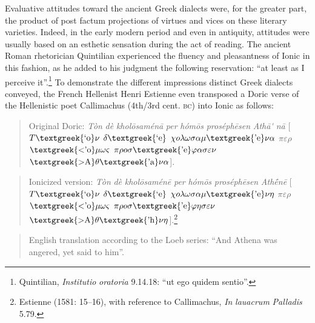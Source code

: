 \documentclass[output=paper]{langsci/langscibook}
\begin{document}
Evaluative attitudes toward the ancient Greek dialects were, for the greater part, the product of post factum projections of virtues and vices on these literary varieties. Indeed, in the early modern period and even in antiquity, attitudes were usually based on an esthetic sensation during the act of reading. The ancient Roman rhetorician Quintilian experienced the fluency and pleasantness of Ionic in this fashion, as he added to his judgment the following reservation: “at least as I perceive it”.\footnote{Quintilian, \textit{Institutio} \textit{oratoria} 9.14.18: “ut ego quidem sentio”.} To demonstrate the different impressions distinct Greek dialects conveyed, the French Hellenist Henri Estienne even transposed a Doric verse of the Hellenistic poet Callimachus (4th/3rd cent. \textsc{bc}) into Ionic as follows:

\begin{quote}
Original Doric: \textit{Tòn} \textit{dè} \textit{kholōsaménā} \textit{per} \textit{hómōs} \textit{proséphēsen} \textit{Athā\'{} nā} [$T\text{\textgreek{`o}}\nu $ $\delta \text{\textgreek{`e}}$ $\chi o\lambda \omega \sigma \alpha \mu \text{\textgreek{'e}}\nu \alpha $ $\pi \varepsilon \rho $ $\text{\textgreek{<'o}}\mu \omega \varsigma $ $\pi \rho o\sigma \text{\textgreek{'e}}\varphi \alpha \sigma \varepsilon \nu $ $\text{\textgreek{>A}}\theta \text{\textgreek{'a}}\nu \alpha $].
\end{quote}

\begin{quote}
Ionicized version: \textit{Tòn} \textit{dè} \textit{kholōsaménē} \textit{per} \textit{hómōs} \textit{proséphēsen} \textit{Athḗnē} [$T\text{\textgreek{`o}}\nu $ $\delta \text{\textgreek{`e}}$ $\chi o\lambda \omega \sigma \alpha \mu \text{\textgreek{'e}}\nu \eta $ $\pi \varepsilon \rho $ $\text{\textgreek{<'o}}\mu \omega \varsigma $ $\pi \rho o\sigma \text{\textgreek{'e}}\varphi \eta \sigma \varepsilon \nu $ $\text{\textgreek{>A}}\theta \text{\textgreek{'h}}\nu \eta $].\footnote{Estienne (1581: 15–16), with reference to Callimachus, \textit{In} \textit{lauacrum} \textit{Palladis} 5.79.}
\end{quote}

\begin{quote}
English translation according to the Loeb series: “And Athena was angered, yet said to him”.
\end{quote}
\end{document}
